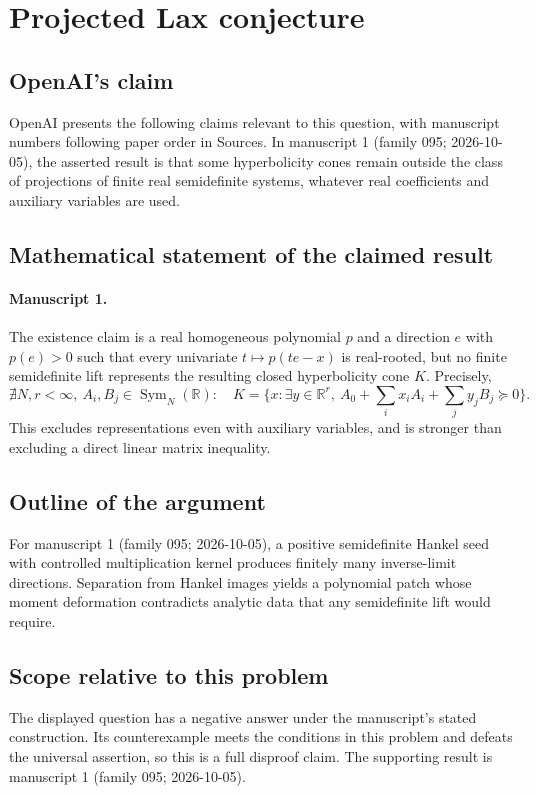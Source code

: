 \documentclass[11pt]{article}
\begin{document}
\section*{Projected Lax conjecture}

\subsection{OpenAI's claim}
OpenAI presents the following claims relevant to this question, with manuscript numbers following paper order in Sources. In manuscript 1 (family 095; 2026-10-05), the asserted result is that some hyperbolicity cones remain outside the class of projections of finite real semidefinite systems, whatever real coefficients and auxiliary variables are used.

\subsection{Mathematical statement of the claimed result}
\paragraph{Manuscript 1.}
The existence claim is a real homogeneous polynomial $p$ and a direction $e$ with $p(e)>0$ such that every univariate $t\mapsto p(te-x)$ is real-rooted, but no finite semidefinite lift represents the resulting closed hyperbolicity cone $K$. Precisely,
\[
 \nexists N,r<\infty,\ A_i,B_j\in\operatorname{Sym}_N(\mathbb R):\quad
 K=\{x:\exists y\in\mathbb R^r,\ A_0+\sum_ix_iA_i+\sum_jy_jB_j\succeq0\}.
\]
This excludes representations even with auxiliary variables, and is stronger than excluding a direct linear matrix inequality.

\subsection{Outline of the argument}
For manuscript 1 (family 095; 2026-10-05), a positive semidefinite Hankel seed with controlled multiplication kernel produces finitely many inverse-limit directions. Separation from Hankel images yields a polynomial patch whose moment deformation contradicts analytic data that any semidefinite lift would require.

\subsection{Scope relative to this problem}
The displayed question has a negative answer under the manuscript's stated construction. Its counterexample meets the conditions in this problem and defeats the universal assertion, so this is a full disproof claim. The supporting result is manuscript 1 (family 095; 2026-10-05).
\end{document}
